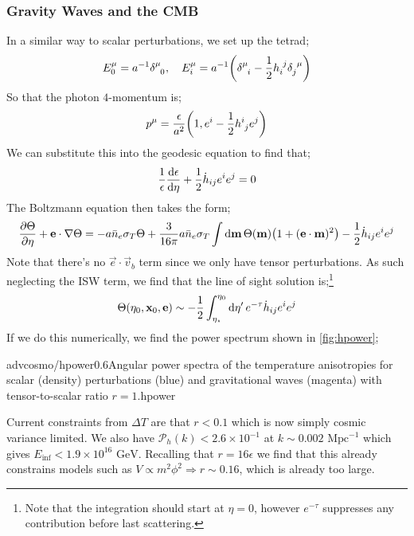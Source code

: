 \subsubsection{Gravity Waves and the CMB}
In a similar way to scalar perturbations, we set up the tetrad;
\begin{equation*}
E_0^{\mu} = a^{-1}\delta\indices{^{\mu}_{0}}, \quad E_i^{\mu} = a^{-1}\left(\delta\indices{^{\mu}_{i}} - \frac{1}{2}h\indices{_{i}^{j}}\delta\indices{_{j}^{\mu}}\right)
\end{equation*}
So that the photon $4$-momentum is;
\begin{equation*}
p^{\mu} = \frac{\epsilon}{a^2}\left(1, e^{i} - \frac{1}{2}h\indices{^{i}_{j}}e^{j}\right)
\end{equation*}
We can substitute this into the geodesic equation to find that;
\begin{equation*}
\frac{1}{\epsilon}\frac{\text{d} \epsilon}{\text{d} \eta} + \frac{1}{2}\dot{h}_{ij}e^{i}e^{j} = 0
\end{equation*}
The Boltzmann equation then takes the form;
\begin{dmath*}
\frac{\del \Theta}{\del \eta} + \vec{e}\cdot\nabla \Theta = - a\bar{n}_e \sigma_T \Theta + \frac{3}{16\pi}a\bar{n}_e\sigma_T \int{\upd{\vec{m}}\Theta(\vec{m})\left(1 + (\vec{e}\cdot\vec{m})^2\right)} - \frac{1}{2}\dot{h}_{ij}e^{i}e^{j}
\end{dmath*}
Note that there's no $\vec{e}\cdot\vec{v}_b$ term since we only have tensor perturbations. As such neglecting the ISW term, we find that the line of sight solution is;\footnote{Note that the integration should start at $\eta = 0$, however $e^{-\tau}$ suppresses any contribution before last scattering.}
\begin{equation}
\Theta(\eta_0, \mathbf{x}_0, \mathbf{e}) \sim -\frac{1}{2}\int_{\eta_\star}^{\eta_0}{\text{d}\eta^{\prime} \,e^{-\tau}\dot{h}_{ij}e^{i}e^{j}}
\end{equation}
If we do this numerically, we find the power spectrum shown in \autoref{fig:hpower};
\begin{mygraphic}{advcosmo/hpower}{0.6}{Angular power spectra of the temperature anisotropies for scalar (density) perturbations (blue) and gravitational waves (magenta) with tensor-to-scalar ratio $r = 1$.}{hpower}\end{mygraphic}
Current constraints from $\Delta T$ are that $r < 0.1$ which is now simply cosmic variance limited. We also have $\mathcal{P}_h(k) < 2.6 \times 10^{-1}$ at $k \sim 0.002 \,\,\text{Mpc}^{-1}$ which gives $E_{\text{inf}} < 1.9\times 10^{16}\,\,\text{GeV}$. Recalling that $r = 16\epsilon$ we find that this already constrains models such as $V \propto m^2 \phi^2 \Rightarrow r \sim 0.16$, which is already too large.
